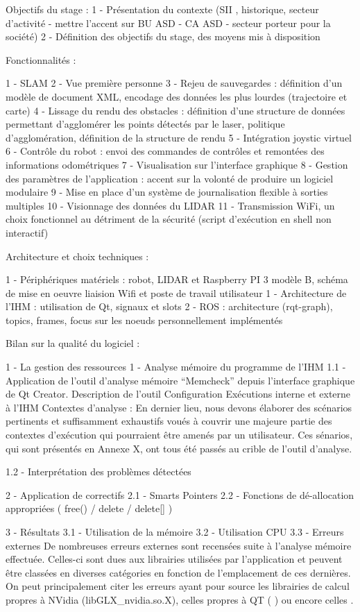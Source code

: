 Objectifs du stage : 
1 - Présentation du contexte (SII , historique, secteur d'activité - mettre l'accent sur BU ASD - CA ASD - secteur porteur pour la société) 
2 - Définition des objectifs du stage, des moyens mis à disposition

Fonctionnalités : 

1 - SLAM 
2 - Vue première personne
3 - Rejeu de sauvegardes : définition d'un modèle de document XML, encodage des données les plus lourdes (trajectoire et carte)
4 - Lissage du rendu des obstacles : 	définition d'une structure de données permettant d'agglomérer les points détectés par le laser, 
					politique d'agglomération, définition de la structure de rendu
5 - Intégration joystic virtuel
6 - Contrôle du robot : envoi des commandes de contrôles et remontées des informations odométriques		
7 - Visualisation sur l'interface graphique
8 - Gestion des paramètres de l'application : accent sur la volonté de produire un logiciel modulaire 
9 - Mise en place d'un système de journalisation flexible à sorties multiples 
10 - Visionnage des données du LIDAR 
11 - Transmission WiFi, un choix fonctionnel au détriment de la sécurité (script d'exécution en shell non interactif) 

Architecture et choix techniques :

1 - Périphériques matériels : robot, LIDAR et Raspberry PI 3 modèle B, schéma de mise en oeuvre liaision Wifi et poste
de travail utilisateur 
1 - Architecture de l'IHM : utilisation de Qt, signaux et slots 
2 - ROS : architecture (rqt-graph), topics, frames, focus sur les noeuds personnellement implémentés  

Bilan sur la qualité du logiciel : 

1 - La gestion des ressources
  1 - Analyse mémoire du programme de l'IHM  
  1.1 - Application de l'outil d'analyse mémoire ``Memcheck'' depuis l'interface graphique de Qt Creator. 
  Description de l'outil 
  Configuration 
  Exécutions interne et externe à l'IHM 
  Contextes d'analyse : En dernier lieu, nous devons élaborer des scénarios pertinents et suffisamment exhaustifs voués à couvrir une majeure partie des contextes 
  d'exécution qui pourraient être amenés par un utilisateur. Ces sénarios, qui sont présentés en Annexe X, ont tous été passés au crible de l'outil d'analyse.   

  1.2 - Interprétation des problèmes détectées

  2 - Application de correctifs 
  2.1 - Smarts Pointers  
  2.2 - Fonctions de dé-allocation appropriées ( free() / delete / delete[] )   

  3 - Résultats 
  3.1 - Utilisation de la mémoire 
  3.2 - Utilisation CPU
  3.3 - Erreurs externes 
  De nombreuses erreurs externes sont recensées suite à l'analyse mémoire effectuée.
  Celles-ci sont dues aux librairies utilisées par l'application et peuvent être classées en diverses catégories en fonction de l'emplacement de ces dernières. 
  On peut principalement citer les erreurs ayant pour source les librairies de calcul propres à NVidia (libGLX_nvidia.so.X), celles propres à QT ( ) ou encore celles .  